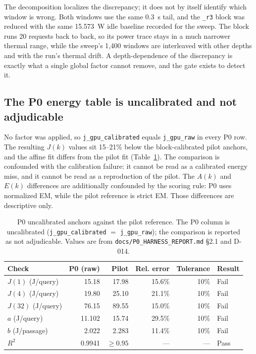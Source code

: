 \documentclass[a4paper,fleqn]{cas-sc}
\begin{document}
The decomposition localizes the discrepancy; it does not by itself identify which window is
wrong. Both windows use the same 0.3~s tail, and the \texttt{\_r3} block was reduced with the
same 15.573~W idle baseline recorded for the sweep. The block runs 20
requests back to back, so its power trace stays in a much narrower thermal range, while the
sweep's 1{,}400 windows are interleaved with other depths and with the run's thermal drift. A
depth-dependence of the discrepancy is exactly what a single global factor cannot remove, and
the gate exists to detect it.

\subsection{The P0 energy table is uncalibrated and not adjudicable}

No factor was applied, so \texttt{j\_gpu\_calibrated} equals \texttt{j\_gpu\_raw} in every P0
row. The resulting $J(k)$ values sit 15--21\% below the block-calibrated pilot anchors, and the
affine fit differs from the pilot fit (Table~\ref{tab:anchors}). The comparison is confounded
with the calibration failure: it cannot be read as a calibrated energy miss, and it cannot be
read as a reproduction of the pilot. The $A(k)$ and $E(k)$ differences are additionally
confounded by the scoring rule: P0 uses normalized EM, while the pilot reference is strict EM.
Those differences are descriptive only.

\begin{table}[pos=htbp]
  \centering
  \caption{P0 uncalibrated anchors against the pilot reference. The P0 column is uncalibrated
  (\texttt{j\_gpu\_calibrated} $=$ \texttt{j\_gpu\_raw}); the comparison is reported as not
  adjudicable. Values are from \texttt{docs/P0\_HARNESS\_REPORT.md} \S2.1 and D-014.}
  \label{tab:anchors}
  \small
  \setlength{\tabcolsep}{4pt}
  \begin{tabular}{lrrrrl}
    \toprule
    \textbf{Check} & \textbf{P0 (raw)} & \textbf{Pilot} & \textbf{Rel. error} & \textbf{Tolerance} & \textbf{Result} \\
    \midrule
    $J(1)$ (J/query) & 15.18 & 17.98 & 15.6\% & 10\% & Fail \\
    $J(4)$ (J/query) & 19.80 & 25.10 & 21.1\% & 10\% & Fail \\
    $J(32)$ (J/query) & 76.15 & 89.55 & 15.0\% & 10\% & Fail \\
    $a$ (J/query) & 11.102 & 15.74 & 29.5\% & 10\% & Fail \\
    $b$ (J/passage) & 2.022 & 2.283 & 11.4\% & 10\% & Fail \\
    $R^2$ & 0.9941 & $\ge0.95$ & --- & --- & Pass \\
    \bottomrule
  \end{tabular}
\end{table}
\end{document}
